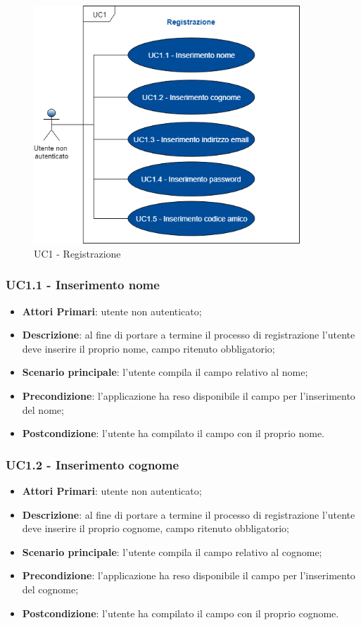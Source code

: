 \begin{figure}[h]
	\includegraphics[width=10cm]{res/images/UC1Registrazione.png}
	\centering
	\caption{UC1 - Registrazione}
\end{figure}
\subsubsection{UC1.1 - Inserimento nome}
\begin{itemize}
	\item \textbf{Attori Primari}: utente non autenticato;
	\item \textbf{Descrizione}: al fine di portare a termine il processo di registrazione l'utente deve inserire il proprio nome, campo ritenuto obbligatorio;
	\item \textbf{Scenario principale}: l'utente compila il campo relativo al nome;	
	\item \textbf{Precondizione}: l'applicazione ha reso disponibile il campo per l'inserimento del nome;
	\item \textbf{Postcondizione}: l'utente ha compilato il campo con il proprio nome.	
\end{itemize}
\subsubsection{UC1.2 - Inserimento cognome}
\begin{itemize}
	\item \textbf{Attori Primari}: utente non autenticato;
	\item \textbf{Descrizione}: al fine di portare a termine il processo di registrazione l'utente deve inserire il proprio cognome, campo ritenuto obbligatorio;
	\item \textbf{Scenario principale}: l'utente compila il campo relativo al cognome;	
	\item \textbf{Precondizione}: l'applicazione ha reso disponibile il campo per l'inserimento del cognome;
	\item \textbf{Postcondizione}: l'utente ha compilato il campo con il proprio cognome.	
\end{itemize}
